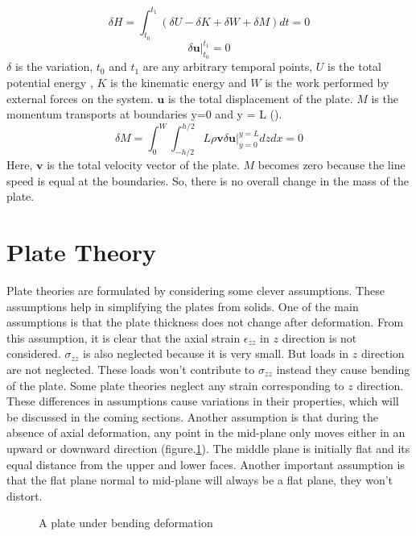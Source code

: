 \documentclass[main.tex]{subfiles}
\begin{document}
 \begin{equation}\label{eq:HAM_P}
 \delta H=\int_{t_0}^{t_1} \left( \delta U - \delta K + \delta W + \delta M \right) dt  = 0  
 \end{equation}
 \begin{equation}\label{eq:HAM_P_C}
  \delta \mathbf{u} \Big|_{t_0}^{t_1} = 0
 \end{equation}
 $\delta$ is the variation, $t_0$ and $t_1$ are any arbitrary temporal points, $U$ is the total potential energy , $K$ is the kinematic energy and $W$ is the work performed by external forces on the system. $\mathbf{u}$ is the total displacement of the plate. $M$ is the momentum transports at boundaries y=0 and y = L (\cite{SAXINGER2016190}). 
 \begin{equation}\label{eq:vr_M}
\delta M= \int_{0}^{W} \int_{-h/2}^{h/2}L \rho \mathbf{v} \delta \mathbf{u} \Big|_{y=0}^{y=L} dz dx  = 0
 \end{equation}
Here, $\mathbf{v}$ is the total velocity vector of the plate. $M$ becomes zero because the line speed is equal at the boundaries. So, there is no overall change in the mass of the plate.

\section{Plate Theory}

Plate theories are formulated by considering some clever assumptions. These assumptions help in simplifying the plates from solids. One of the main assumptions is that the plate thickness does not change after deformation. From this assumption, it is clear that the axial strain $\epsilon_{zz}$ in $z$ direction is not considered. $\sigma_{zz}$ is also neglected because it is very small. But loads in $z$ direction are not neglected. These loads won't contribute to $\sigma_{zz}$ instead they cause bending of the plate. Some plate theories neglect any strain corresponding to $z$ direction. These differences in assumptions cause variations in their properties, which will be discussed in the coming sections. Another assumption is that during the absence of axial deformation, any point in the mid-plane only moves either in an upward or downward direction (figure.\ref{fig:plate_def}). The middle plane is initially flat and its equal distance from the upper and lower faces. Another important assumption is that the flat plane normal to mid-plane will always be a flat plane, they won't distort. 

\begin{figure}[ht!]
\centering
\caption{A plate under bending deformation}
\label{fig:plate_def}
\end{figure}
\end{document}
